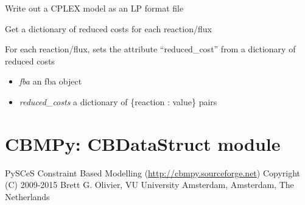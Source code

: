 \documentclass[a4paper,11pt,english]{sphinxmanual}
\begin{document}

\begin{fulllineitems}
\label{modules_doc:cbmpy.CBCPLEX.cplx_writeLPtoLPTfile}
Write out a CPLEX model as an LP format file

\end{fulllineitems}


\begin{fulllineitems}
\label{modules_doc:cbmpy.CBCPLEX.getReducedCosts}
Get a dictionary of reduced costs for each reaction/flux

\end{fulllineitems}


\begin{fulllineitems}
\label{modules_doc:cbmpy.CBCPLEX.setReducedCosts}
For each reaction/flux, sets the attribute ``reduced\_cost'' from a dictionary of
reduced costs
\begin{itemize}
\item {} 
\emph{fba} an fba object

\item {} 
\emph{reduced\_costs} a dictionary of \{reaction : value\} pairs

\end{itemize}

\end{fulllineitems}

\label{modules_doc:module-cbmpy.CBDataStruct}

\section{CBMPy: CBDataStruct module}
\label{modules_doc:cbmpy-cbdatastruct-module}
PySCeS Constraint Based Modelling (\href{http://cbmpy.sourceforge.net}{http://cbmpy.sourceforge.net})
Copyright (C) 2009-2015 Brett G. Olivier, VU University Amsterdam, Amsterdam, The Netherlands
\end{document}
